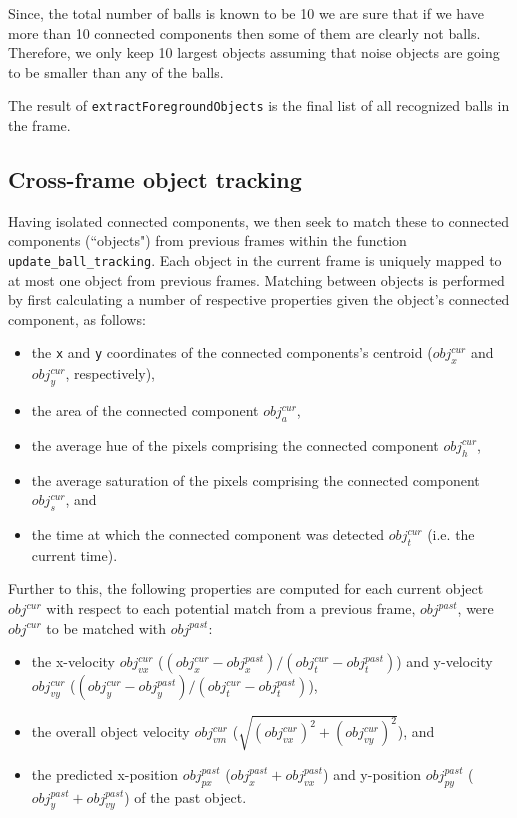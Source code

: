 \documentclass[12pt,a4paper]{article}
\begin{document}
Since, the total number of balls is known to be 10 we are sure that if we have more than 10 connected components then some of them are clearly not balls. Therefore, we only keep 10 largest objects assuming that noise objects are going to be smaller than any of the balls.

The result of \texttt{extractForegroundObjects} is the final list of all recognized balls in the frame.    

\subsection{Cross-frame object tracking}
Having isolated connected components, we then seek to match these to connected components (``objects") from previous frames within the function \texttt{update\_ball\_tracking}. Each object in the current frame is uniquely mapped to at most one object from previous frames. Matching between objects is performed by first calculating a number of respective properties given the object's connected component, as follows:
\begin{itemize}
\item the \texttt{x} and \texttt{y} coordinates of the connected components's centroid ($obj_x^{cur}$ and $obj_y^{cur}$, respectively),
\item the area of the connected component $obj_{a}^{cur}$,
\item the average hue of the pixels comprising the connected component $obj_{h}^{cur}$,
\item the average saturation of the pixels comprising the connected component $obj_{s}^{cur}$, and
\item the time at which the connected component was detected $obj_{t}^{cur}$ (i.e. the current time).
\end{itemize}
Further to this, the following properties are computed for each current object $obj^{cur}$ with respect to each potential match from a previous frame, $obj^{past}$, were $obj^{cur}$ to be matched with $obj^{past}$:
\begin{itemize}
\item the x-velocity $obj_{vx}^{cur}$ ($(obj_x^{cur} - obj_x^{past}) / (obj_t^{cur} - obj_t^{past})$) and y-velocity $obj_{vy}^{cur}$ ($(obj_y^{cur} - obj_y^{past}) / (obj_t^{cur} - obj_t^{past})$),
\item the overall object velocity $obj_{vm}^{cur}$ ($\sqrt{(obj_{vx}^{cur})^2 + (obj_{vy}^{cur})^2}$), and
\item the predicted x-position $obj_{px}^{past}$ ($obj_x^{past} + obj_{vx}^{past}$) and y-position $obj_{py}^{past}$ ($obj_y^{past} + obj_{vy}^{past}$) of the past object.
\end{itemize}
\end{document}
